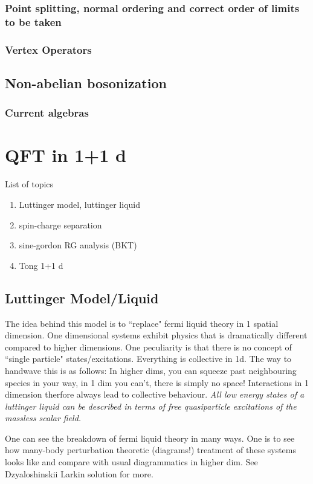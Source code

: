 \documentclass{article}
\begin{document}
\subsubsection{Point splitting, normal ordering and correct order of limits to be taken}
\subsubsection{Vertex Operators}
\subsection{Non-abelian bosonization}
\subsubsection{Current algebras}
\section{QFT in 1+1 d}
List of topics
\begin{enumerate}
    \item Luttinger model, luttinger liquid
    \item spin-charge separation
    \item sine-gordon RG analysis (BKT)
    \item Tong 1+1 d
\end{enumerate}
\subsection{Luttinger Model/Liquid}
The idea behind this model is to ``replace" fermi liquid theory in 1 spatial dimension. One dimensional systems exhibit physics that is dramatically different compared to higher dimensions. One peculiarity is that there is no concept of ``single particle" states/excitations. Everything is collective in 1d. The way to handwave this is as follows: In higher dims, you can squeeze past neighbouring species in your way, in 1 dim you can't, there is simply no space! Interactions in 1 dimension therfore always lead to collective behaviour. \emph{All low energy states of a luttinger liquid can be described in terms of free quasiparticle excitations of the massless scalar field.}

One can see the breakdown of fermi liquid theory in many ways. One is to see how many-body perturbation theoretic (diagrams!) treatment of these systems looks like and compare with usual diagrammatics in higher dim. See Dzyaloshinskii Larkin solution for more. \cite{sadovskii2006diagrammatics, giamarchi2003quantum}
\end{document}
